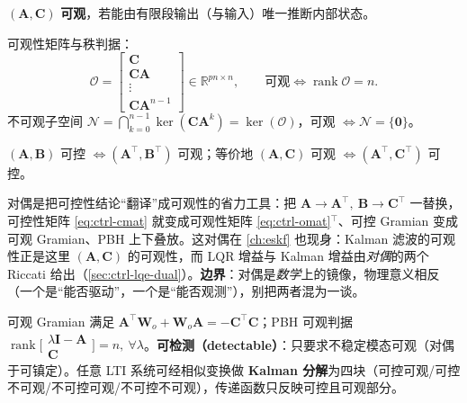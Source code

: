 \begin{definition}[可观]
\label{def:ctrl-observable}
$(\mathbf{A},\mathbf{C})$ \textbf{可观}，若能由有限段输出（与输入）唯一推断内部状态。
\end{definition}

可观性矩阵与秩判据\cite{rawlings2020mpc}：
\begin{equation}
  \boxed{\mathcal{O}=\begin{bmatrix}\mathbf{C}\\\mathbf{C}\mathbf{A}\\\vdots\\\mathbf{C}\mathbf{A}^{n-1}\end{bmatrix}\in\mathbb{R}^{pn\times n},\qquad\text{可观}\iff\operatorname{rank}\mathcal{O}=n.}
  \label{eq:ctrl-omat}
\end{equation}
不可观子空间 $\mathcal{N}=\bigcap_{k=0}^{n-1}\ker(\mathbf{C}\mathbf{A}^k)=\ker(\mathcal{O})$，可观 $\iff\mathcal{N}=\{\mathbf{0}\}$。

\begin{theorem}[可控--可观对偶]
\label{thm:ctrl-duality}
$(\mathbf{A},\mathbf{B})$ 可控 $\iff(\mathbf{A}^\top,\mathbf{B}^\top)$ 可观；等价地 $(\mathbf{A},\mathbf{C})$ 可观 $\iff(\mathbf{A}^\top,\mathbf{C}^\top)$ 可控\cite{rawlings2020mpc}。
\end{theorem}

\begin{insight}
对偶是把可控性结论“翻译”成可观性的省力工具：把 $\mathbf{A}\to\mathbf{A}^\top,\ \mathbf{B}\to\mathbf{C}^\top$ 一替换，可控性矩阵 \cref{eq:ctrl-cmat} 就变成可观性矩阵 \cref{eq:ctrl-omat}$^\top$、可控 Gramian 变成可观 Gramian、PBH 上下叠放。这对偶在 \cref{ch:eskf} 也现身：Kalman 滤波的可观性正是这里 $(\mathbf{A},\mathbf{C})$ 的可观性，而 LQR 增益与 Kalman 增益由\emph{对偶}的两个 Riccati 给出（\cref{sec:ctrl-lqe-dual}）。\textbf{边界}：对偶是\emph{数学}上的镜像，物理意义相反（一个是“能否驱动”，一个是“能否观测”），别把两者混为一谈。
\end{insight}

可观 Gramian 满足 $\mathbf{A}^\top\mathbf{W}_o+\mathbf{W}_o\mathbf{A}=-\mathbf{C}^\top\mathbf{C}$；PBH 可观判据 $\operatorname{rank}\big[\begin{smallmatrix}\lambda\mathbf{I}-\mathbf{A}\\\mathbf{C}\end{smallmatrix}\big]=n,\ \forall\lambda$。\textbf{可检测（detectable）}：只要求不稳定模态可观（对偶于可镇定）。任意 LTI 系统可经相似变换做 \textbf{Kalman 分解}为四块（可控可观/可控不可观/不可控可观/不可控不可观），传递函数只反映可控且可观部分。

